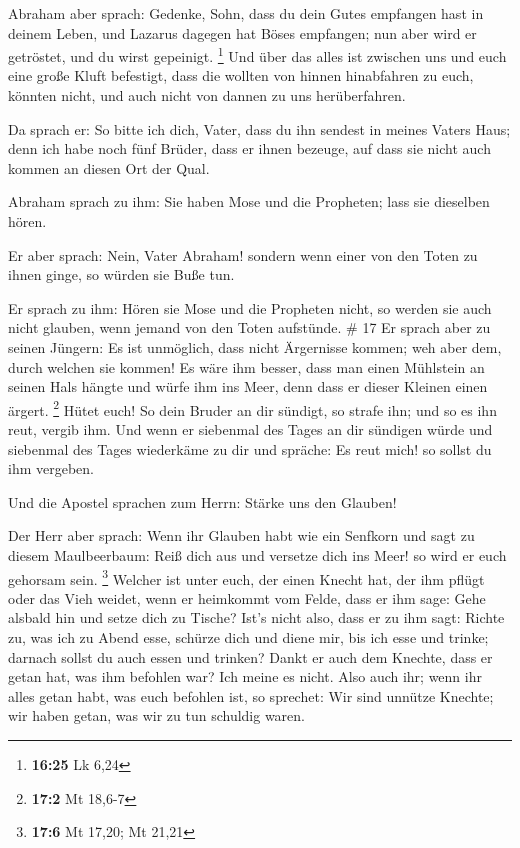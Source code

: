  Abraham aber sprach: Gedenke, Sohn, dass du dein Gutes
empfangen hast in deinem Leben, und Lazarus dagegen hat Böses empfangen;
nun aber wird er getröstet, und du wirst gepeinigt. \footnote{\textbf{16:25}
  Lk 6,24}  Und über das alles ist zwischen uns und euch
eine große Kluft befestigt, dass die wollten von hinnen hinabfahren zu
euch, könnten nicht, und auch nicht von dannen zu uns herüberfahren.

 Da sprach er: So bitte ich dich, Vater, dass du ihn
sendest in meines Vaters Haus;  denn ich habe noch fünf
Brüder, dass er ihnen bezeuge, auf dass sie nicht auch kommen an diesen
Ort der Qual.

 Abraham sprach zu ihm: Sie haben Mose und die Propheten;
lass sie dieselben hören.

 Er aber sprach: Nein, Vater Abraham! sondern wenn einer
von den Toten zu ihnen ginge, so würden sie Buße tun.

 Er sprach zu ihm: Hören sie Mose und die Propheten nicht,
so werden sie auch nicht glauben, wenn jemand von den Toten aufstünde.
\# 17  Er sprach aber zu seinen Jüngern: Es ist unmöglich,
dass nicht Ärgernisse kommen; weh aber dem, durch welchen sie kommen!
 Es wäre ihm besser, dass man einen Mühlstein an seinen Hals
hängte und würfe ihm ins Meer, denn dass er dieser Kleinen einen ärgert.
\footnote{\textbf{17:2} Mt 18,6-7}  Hütet euch! So dein
Bruder an dir sündigt, so strafe ihn; und so es ihn reut, vergib ihm.
 Und wenn er siebenmal des Tages an dir sündigen würde und
siebenmal des Tages wiederkäme zu dir und spräche: Es reut mich! so
sollst du ihm vergeben.

 Und die Apostel sprachen zum Herrn: Stärke uns den Glauben!

 Der Herr aber sprach: Wenn ihr Glauben habt wie ein
Senfkorn und sagt zu diesem Maulbeerbaum: Reiß dich aus und versetze
dich ins Meer! so wird er euch gehorsam sein. \footnote{\textbf{17:6} Mt
  17,20; Mt 21,21}  Welcher ist unter euch, der einen Knecht
hat, der ihm pflügt oder das Vieh weidet, wenn er heimkommt vom Felde,
dass er ihm sage: Gehe alsbald hin und setze dich zu Tische?
 Ist's nicht also, dass er zu ihm sagt: Richte zu, was ich
zu Abend esse, schürze dich und diene mir, bis ich esse und trinke;
darnach sollst du auch essen und trinken?  Dankt er auch dem
Knechte, dass er getan hat, was ihm befohlen war? Ich meine es nicht.
 Also auch ihr; wenn ihr alles getan habt, was euch
befohlen ist, so sprechet: Wir sind unnütze Knechte; wir haben getan,
was wir zu tun schuldig waren.

